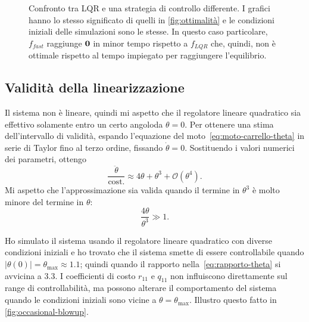\begin{figure}
    \caption[Confronto tra LQR e un controllo più rapido]{
        Confronto tra LQR e una strategia di controllo differente.
        I grafici hanno lo stesso significato di quelli in \autoref{fig:ottimalità}
        e le condizioni iniziali delle simulazioni sono le stesse.
        In questo caso particolare, $f_{fast}$ raggiunge $\mathbf{0}$ in minor
        tempo rispetto a $f_{LQR}$ che, quindi, non è ottimale rispetto
        al tempo impiegato per raggiungere l'equilibrio.
    }
    \label{fig:non-ottimalità}
\end{figure}

\subsection{Validità della linearizzazione}
Il sistema non è lineare, quindi mi aspetto che il regolatore lineare quadratico sia
effettivo solamente entro un certo angolo\footnotemark da $\theta = 0$.
Per ottenere una stima dell'intervallo di validità, espando l'equazione del
moto~\eqref{eq:moto-carrello-theta} in serie di Taylor fino al terzo ordine,
fissando $\dot \theta = 0$.
Sostituendo i valori numerici dei parametri, ottengo
\begin{equation*}
    \frac {\ddot \theta} {\text{cost.}} \approx 4 \theta + \theta^3 + \mathcal O(\theta^4).
\end{equation*}
Mi aspetto che l'approssimazione sia valida quando il termine in $\theta^3$ è
molto minore del termine in $\theta$:
\begin{equation}
    \frac{4\theta} {\theta^3} \gg 1.
    \label{eq:rapporto-theta}
\end{equation}


Ho simulato il sistema usando il regolatore lineare quadratico
con diverse condizioni iniziali e ho trovato che
il sistema smette di essere controllabile quando $|\theta(0)| = \theta_{\max} \approx 1.1$;
quindi quando il rapporto nella~\eqref{eq:rapporto-theta} si avvicina a $3.3$.
I coefficienti di costo $r_{11}$ e $q_{11}$ non influiscono
direttamente sul range di controllabilità, ma possono alterare
il comportamento del sistema quando le condizioni iniziali sono
vicine a $\theta = \theta_{\max}$.
Illustro questo fatto in \autoref{fig:occasional-blowup}.

